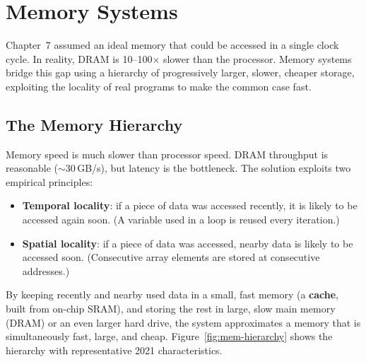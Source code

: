 \documentclass[9pt, a4paper]{extarticle}
\begin{document}
\newpage

\section{Memory Systems}
\label{sec:memory}

Chapter~7 assumed an ideal memory that could be accessed in a single clock cycle. In reality, DRAM is 10--100$\times$ slower than the processor. Memory systems bridge this gap using a hierarchy of progressively larger, slower, cheaper storage, exploiting the locality of real programs to make the common case fast.

\subsection{The Memory Hierarchy}

Memory speed is much slower than processor speed. DRAM throughput is reasonable ($\sim$30\,GB/s), but latency is the bottleneck. The solution exploits two empirical principles:

\begin{itemize}
    \item \textbf{Temporal locality}: if a piece of data was accessed recently, it is likely to be accessed again soon. (A variable used in a loop is reused every iteration.)
    \item \textbf{Spatial locality}: if a piece of data was accessed, nearby data is likely to be accessed soon. (Consecutive array elements are stored at consecutive addresses.)
\end{itemize}

By keeping recently and nearby used data in a small, fast memory (a \textbf{cache}, built from on-chip SRAM), and storing the rest in large, slow main memory (DRAM) or an even larger hard drive, the system approximates a memory that is simultaneously fast, large, and cheap. Figure~\ref{fig:mem-hierarchy} shows the hierarchy with representative 2021 characteristics.
\end{document}
